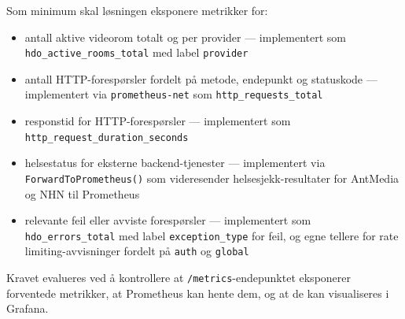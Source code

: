 Som minimum skal løsningen eksponere metrikker for:
\begin{itemize}
    \item antall aktive videorom totalt og per provider —
          implementert som \texttt{hdo\_active\_\allowbreak rooms\_\allowbreak total}
          med label \texttt{provider}
    \item antall HTTP-forespørsler fordelt på metode, endepunkt 
          og statuskode — implementert via \texttt{prometheus-net} 
          som \texttt{http\_requests\_total}
    \item responstid for HTTP-forespørsler — implementert som 
          \texttt{http\_request\_duration\_seconds}
    \item helsestatus for eksterne backend-tjenester — implementert 
          via \texttt{ForwardToPrometheus()} som videresender 
          helsesjekk-resultater for AntMedia og NHN til Prometheus
    \item relevante feil eller avviste forespørsler — implementert 
          som \texttt{hdo\_errors\_total} med label 
          \texttt{exception\_type} for feil, og egne tellere for 
          rate limiting-avvisninger fordelt på \texttt{auth} og 
          \texttt{global}
\end{itemize}

Kravet evalueres ved å kontrollere at \texttt{/metrics}-endepunktet 
eksponerer forventede metrikker, at Prometheus kan hente dem, og at 
de kan visualiseres i Grafana.